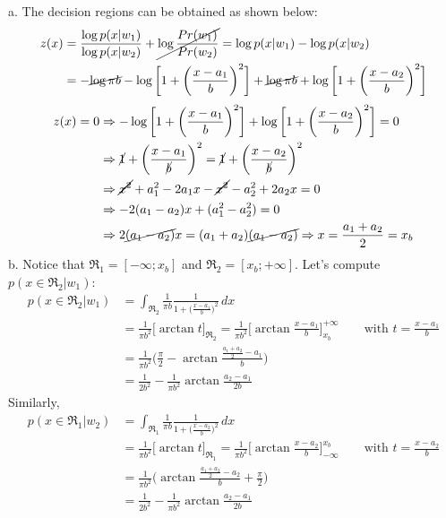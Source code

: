 \Answer[number={10}]
a. The decision regions can be obtained as shown below:
\begin{align*}
    z(x)
    &=\frac{\log{p(x|w_1)}}{\log{p(x|w_2)}}+\cancel{\log{\frac{Pr(w_1)}{Pr(w_2)}}}
    =\log{p(x|w_1)}-\log{p(x|w_2)}\\
    &=-\cancel{\log{\pi b}}-\log{\biggl[1+\biggl(\frac{x-a_1}{b}\biggr)^2\biggr]}+\cancel{\log{\pi b}}+\log{\biggl[1+\biggl(\frac{x-a_2}{b}\biggr)^2\biggr]}
\end{align*}
\begin{align*}
    z(x)=0
    &\Rightarrow
    -\log{\biggl[1+\biggl(\frac{x-a_1}{b}\biggr)^2\biggr]}+\log{\biggl[1+\biggl(\frac{x-a_2}{b}\biggr)^2\biggr]}=0\\
    &\Rightarrow
    \cancel{1}+\biggl(\frac{x-a_1}{\cancel{b}}\biggr)^2=\cancel{1}+\biggl(\frac{x-a_2}{\cancel{b}}\biggr)^2\\
    &\Rightarrow
    \cancel{x^2}+a_1^2-2a_1x-\cancel{x^2}-a_2^2+2a_2x=0\\
    &\Rightarrow
    -2(a_1-a_2)x+(a_1^2-a_2^2)=0\\
    &\Rightarrow
    2\cancel{(a_1-a_2)}x=(a_1+a_2)\cancel{(a_1-a_2)}
    \Rightarrow
    x=\frac{a_1+a_2}{2}=x_b
\end{align*}
b. Notice that \(\mathfrak{R}_1=[-\infty; x_b]\) and
\(\mathfrak{R}_2=[x_b; +\infty]\).
Let's compute \(p(x\in\mathfrak{R}_2|w_1)\):
\begin{align*}
    p(x\in\mathfrak{R}_2|w_1)
    &=\int_{\mathfrak{R}_2}\frac{1}{\pi b}\frac{1}{1+\bigl(\frac{x-a_1}{b}\bigr)^2}\,dx\\
    &=\frac{1}{\pi b^2}\biggl[\arctan{t}\biggr]_{\mathfrak{R}_2}
    =\frac{1}{\pi b^2}\biggl[\arctan{\frac{x-a_1}{b}}\biggr]_{x_b}^{+\infty}
    \quad\quad\text{with } t=\frac{x-a_1}{b}\\
    &=\frac{1}{\pi b^2}\biggl(\frac{\pi}{2}-\arctan{\frac{\frac{a_1+a_2}{2}-a_1}{b}}\biggr)\\
    &=\frac{1}{2b^2}-\frac{1}{\pi b^2}\arctan{\frac{a_2-a_1}{2b}}
\end{align*}
Similarly,
\begin{align*}
    p(x\in\mathfrak{R}_1|w_2)
    &=\int_{\mathfrak{R}_1}\frac{1}{\pi b}\frac{1}{1+\bigl(\frac{x-a_2}{b}\bigr)^2}\,dx\\
    &=\frac{1}{\pi b^2}\biggl[\arctan{t}\biggr]_{\mathfrak{R}_1}
    =\frac{1}{\pi b^2}\biggl[\arctan{\frac{x-a_2}{b}}\biggr]_{-\infty}^{x_b}
    \quad\quad\text{with } t=\frac{x-a_2}{b}\\
    &=\frac{1}{\pi b^2}\biggl(\arctan{\frac{\frac{a_1+a_2}{2}-a_2}{b}+\frac{\pi}{2}}\biggr)\\
    &=\frac{1}{2b^2}-\frac{1}{\pi b^2}\arctan{\frac{a_2-a_1}{2b}}
\end{align*}
